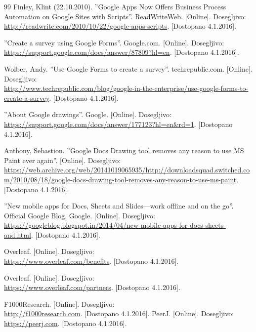 \documentclass[a4paper, 12pt]{book}
\begin{document}
\begin{thebibliography}{99}
 Finley, Klint (22.10.2010). ''Google Apps Now Offers Business Process Automation on Google Sites with Scripts''. ReadWriteWeb.
[Online]. Dosegljivo:\\ 
\url{http://readwrite.com/2010/10/22/google-apps-scripts}.
[Dostopano 4.1.2016].


 ''Create a survey using Google Forms''. Google.com. 
[Online]. Dosegljivo:\\ 
\url{https://support.google.com/docs/answer/87809?hl=en}.
[Dostopano 4.1.2016].

 Wolber, Andy. ''Use Google Forms to create a survey''. techrepublic.com.
[Online]. Dosegljivo:\\ \url{http://www.techrepublic.com/blog/google-in-the-enterprise/use-google-forms-to-create-a-survey}.
[Dostopano 4.1.2016].


 ''About Google drawings''. Google.
[Online]. Dosegljivo:\\ 
\url{https://support.google.com/docs/answer/177123?hl=en\&rd=1}.
[Dostopano 4.1.2016].
 
 Anthony, Sebastion. ''Google Docs Drawing tool removes any reason to use MS Paint ever again''.
[Online]. Dosegljivo:\\ 
\url{https://web.archive.org/web/20141019065935/http://downloadsquad.switched.com/2010/08/18/google-docs-drawing-tool-removes-any-reason-to-use-ms-paint}.
[Dostopano 4.1.2016].


 ''New mobile apps for Docs, Sheets and Slides—work offline and on the go''. Official Google Blog. Google.
[Online]. Dosegljivo:\\ \url{https://googleblog.blogspot.in/2014/04/new-mobile-apps-for-docs-sheets-and.html}.
[Dostopano 4.1.2016].


Overleaf.
[Online]. Dosegljivo:\\
\url{https://www.overleaf.com/benefits}.
[Dostopano 4.1.2016].

Overleaf.
[Online]. Dosegljivo:\\
\url{https://www.overleaf.com/partners}.
[Dostopano 4.1.2016].






F1000Research.
[Online]. Dosegljivo:\\
\url{http://f1000research.com}.
[Dostopano 4.1.2016].
PeerJ.
[Online]. Dosegljivo:\\
\url{https://peerj.com}.
[Dostopano 4.1.2016].


\end{thebibliography}
\end{document}
